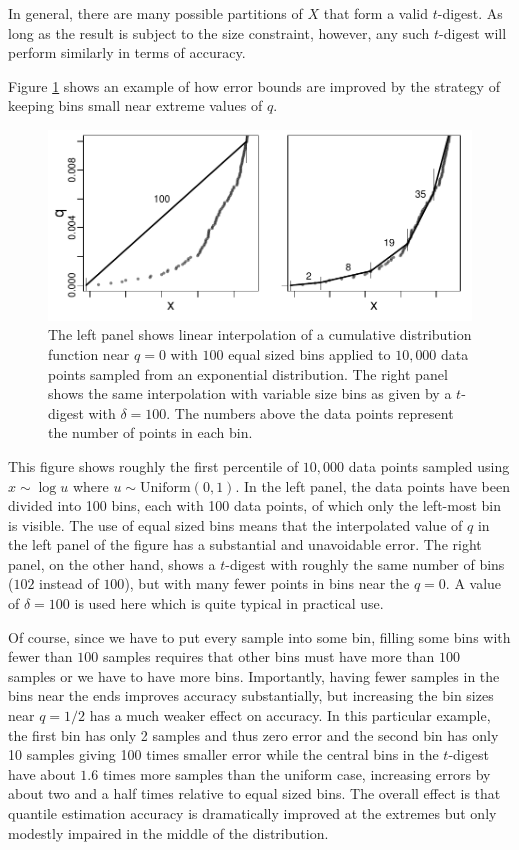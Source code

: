 \documentclass[11pt]{amsart}
\begin{document}
In general, there are many possible partitions of $X$ that form a valid $t$-digest. As long as the result is subject to the size constraint, however, any such $t$-digest will perform similarly in terms of accuracy.

Figure \ref{fig:linear-interpolation} shows an example of how error bounds are improved by the strategy of keeping bins small near extreme values of $q$. 

\begin{figure}[h] %
   \centering
   \includegraphics[height=2.in, clip]{linear-interpolation.pdf} 
   \caption{The left panel shows linear interpolation of a cumulative distribution function near $q=0$ with $100$ equal sized bins applied to $10,000$ data points sampled from an exponential distribution. The right panel shows the same interpolation with variable size bins as given by a $t$-digest with $\delta=100$. The numbers above the data points represent the number of points in each bin. }
   \label{fig:linear-interpolation}
\end{figure}
This figure shows roughly the first percentile of $10,000$ data points sampled using $x \sim \log u$ where $u \sim \mathrm{Uniform}(0,1)$. In the left panel, the data points have been divided into 100 bins, each with 100 data points, of which only the left-most bin is visible. The use of equal sized bins means that the interpolated value of $q$ in the left panel of the figure has a substantial and unavoidable error. The right panel, on the other hand, shows a $t$-digest with roughly the same number of bins ($102$ instead of $100$), but with many fewer points in bins near the $q=0$. A value of $\delta=100$ is used here which is quite typical in practical use. 

Of course, since we have to put every sample into some bin, filling some bins with fewer than $100$ samples requires that other bins must have more than $100$ samples or we have to have more bins. Importantly, having fewer samples in the bins near the ends improves accuracy substantially, but increasing the bin sizes near $q=1/2$ has a much weaker effect on accuracy. In this particular example, the first bin has only 2 samples and thus zero error and the second bin has only 10 samples giving 100 times smaller error while the central bins in the $t$-digest have about $1.6$ times more samples than the uniform case, increasing errors by about two and a half times relative to equal sized bins. The overall effect is that quantile estimation accuracy is dramatically improved at the extremes but only modestly impaired in the middle of the distribution.
\end{document}
